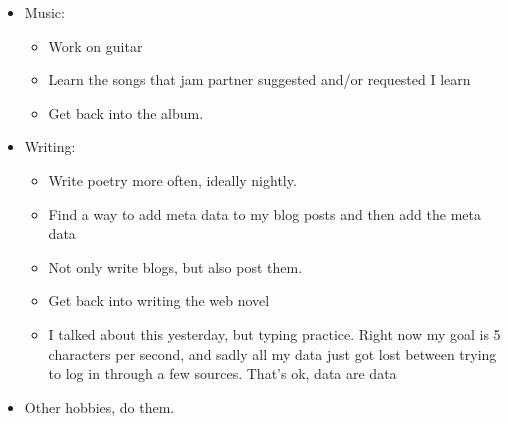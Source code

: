 \documentclass[12pt]{article}[titlepage]
\renewcommand{\,}{\textsuperscript{,}}
\begin{document}
\begin{itemize}
\begin{itemize}
\item Music:   
\begin{itemize}   
\item Work on guitar  
\item Learn the songs that jam partner suggested and/or requested I learn  
\item Get back into the album.  
\end{itemize}   
\item Writing:  
\begin{itemize}   
\item Write poetry more often, ideally nightly.  
\item Find a way to add meta data to my blog posts and then add the meta data  
\item Not only write blogs, but also post them.  
\item Get back into writing the web novel  
\item I talked about this yesterday, but typing practice. Right now my goal is 5 characters per second, and sadly all my data just got lost between trying to log in through a few sources.  
That's ok, data are data  
\end{itemize}   
\item Other hobbies, do them.  
\end{itemize}   
\end{itemize}
\end{document}
